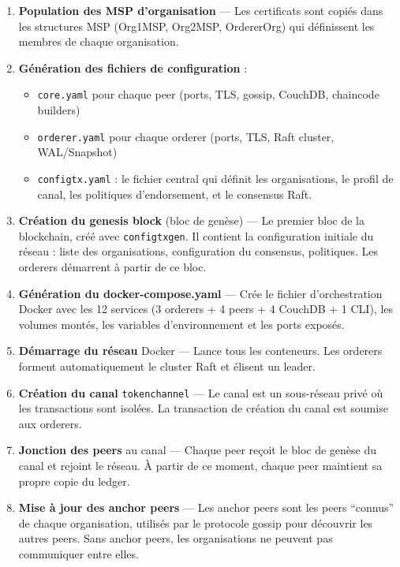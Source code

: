 \documentclass[12pt,a4paper,twoside]{report}
\begin{document}
\begin{enumerate}[leftmargin=2cm]
    \item \textbf{Population des MSP d'organisation} --- Les certificats sont copiés dans les structures MSP (Org1MSP, Org2MSP, OrdererOrg) qui définissent les membres de chaque organisation.
    
    \item \textbf{Génération des fichiers de configuration} :
    \begin{itemize}
        \item \texttt{core.yaml} pour chaque peer (ports, TLS, gossip, CouchDB, chaincode builders)
        \item \texttt{orderer.yaml} pour chaque orderer (ports, TLS, Raft cluster, WAL/Snapshot)
        \item \texttt{configtx.yaml} : le fichier central qui définit les organisations, le profil de canal, les politiques d'endorsement, et le consensus Raft.
    \end{itemize}
    
    \item \textbf{Création du genesis block} (bloc de genèse) --- Le premier bloc de la blockchain, créé avec \texttt{configtxgen}. Il contient la configuration initiale du réseau : liste des organisations, configuration du consensus, politiques. Les orderers démarrent à partir de ce bloc.
    
    \item \textbf{Génération du docker-compose.yaml} --- Crée le fichier d'orchestration Docker avec les 12 services (3 orderers + 4 peers + 4 CouchDB + 1 CLI), les volumes montés, les variables d'environnement et les ports exposés.
    
    \item \textbf{Démarrage du réseau} Docker --- Lance tous les conteneurs. Les orderers forment automatiquement le cluster Raft et élisent un leader.
    
    \item \textbf{Création du canal} \texttt{tokenchannel} --- Le canal est un sous-réseau privé où les transactions sont isolées. La transaction de création du canal est soumise aux orderers.
    
    \item \textbf{Jonction des peers} au canal --- Chaque peer reçoit le bloc de genèse du canal et rejoint le réseau. À partir de ce moment, chaque peer maintient sa propre copie du ledger.
    
    \item \textbf{Mise à jour des anchor peers} --- Les anchor peers sont les peers ``connus'' de chaque organisation, utilisés par le protocole gossip pour découvrir les autres peers. Sans anchor peers, les organisations ne peuvent pas communiquer entre elles.
    

\end{enumerate}
\end{document}
